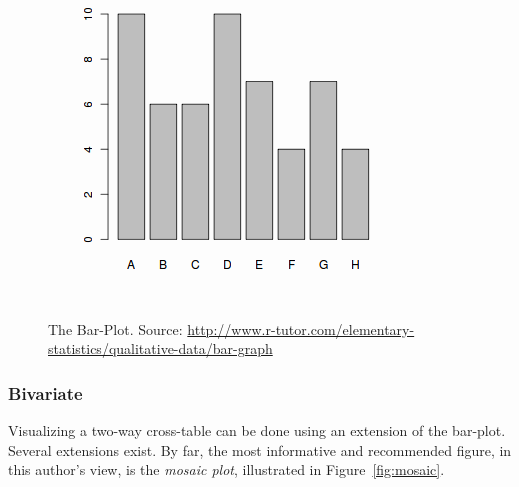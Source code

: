 \documentclass[12pt,a4paper]{report}
\begin{document}
\begin{figure}[h]
\centering
\includegraphics[height=0.3\textheight]{art/categorical-data1x}
\caption[Bar Plot]{The Bar-Plot. Source: \url{http://www.r-tutor.com/elementary-statistics/qualitative-data/bar-graph}}
\label{fig:barplot}
\end{figure}



\subsubsection{Bivariate}
Visualizing a two-way cross-table can be done using an extension of the bar-plot.
Several extensions exist. By far, the most informative and recommended figure, in this author's view, is the \emph{mosaic plot}, illustrated in Figure~\ref{fig:mosaic}. 
\end{document}
